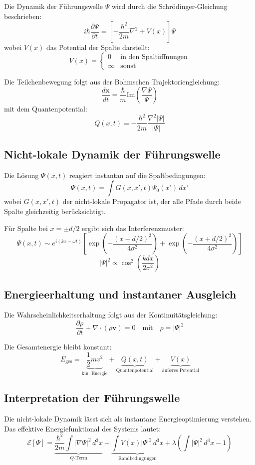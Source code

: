 Die Dynamik der Führungswelle $\Psi$ wird durch die Schrödinger-Gleichung beschrieben:
\[ i\hbar\frac{\partial\Psi}{\partial t} = \left[-\frac{\hbar^2}{2m}\nabla^2 + V(x)\right]\Psi \]
wobei $V(x)$ das Potential der Spalte darstellt:
\[ V(x) = \begin{cases} 
0 & \text{in den Spaltöffnungen} \\
\infty & \text{sonst}
\end{cases} \]

Die Teilchenbewegung folgt aus der Bohmschen Trajektoriengleichung:
\[ \frac{d\mathbf{x}}{dt} = \frac{\hbar}{m}\text{Im}\left(\frac{\nabla\Psi}{\Psi}\right) \]
mit dem Quantenpotential:
\[ Q(x,t) = -\frac{\hbar^2}{2m}\frac{\nabla^2|\Psi|}{|\Psi|} \]

\subsection{Nicht-lokale Dynamik der Führungswelle}

Die Lösung $\Psi(x,t)$ reagiert instantan auf die Spaltbedingungen:
\[ \Psi(x,t) = \int G(x,x',t)\Psi_0(x')\,dx' \]
wobei $G(x,x',t)$ der nicht-lokale Propagator ist, der alle Pfade durch beide Spalte gleichzeitig berücksichtigt.

Für Spalte bei $x = \pm d/2$ ergibt sich das Interferenzmuster:
\[ \Psi(x,t) \sim e^{i(kx-\omega t)}\left[\exp\left(-\frac{(x-d/2)^2}{4\sigma^2}\right) + \exp\left(-\frac{(x+d/2)^2}{4\sigma^2}\right)\right] \]
\[ |\Psi|^2 \propto \cos^2\left(\frac{kdx}{2\sigma^2}\right) \]

\subsection{Energieerhaltung und instantaner Ausgleich}

Die Wahrscheinlichkeitserhaltung folgt aus der Kontinuitätsgleichung:
\[ \frac{\partial\rho}{\partial t} + \nabla\cdot(\rho\mathbf{v}) = 0 \quad \text{mit} \quad \rho = |\Psi|^2 \]

Die Gesamtenergie bleibt konstant:
\[ E_{\text{ges}} = \underbrace{\frac{1}{2}mv^2}_{\text{kin. Energie}} + \underbrace{Q(x,t)}_{\text{Quantenpotential}} + \underbrace{V(x)}_{\text{äußeres Potential}} \]

\subsection{Interpretation der Führungswelle}

Die nicht-lokale Dynamik lässt sich als instantane Energieoptimierung verstehen. Das effektive Energiefunktional des Systems lautet:
\[ \mathcal{E}[\Psi] = \underbrace{\frac{\hbar^2}{2m}\int|\nabla\Psi|^2\,d^3x}_{Q\text{-Term}} + \underbrace{\int V(x)|\Psi|^2\,d^3x}_{\text{Randbedingungen}} + \lambda\left(\int|\Psi|^2\,d^3x - 1\right) \]

